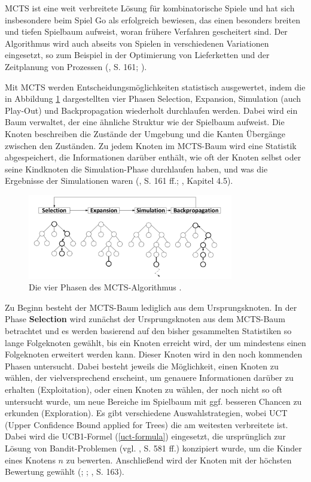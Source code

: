 MCTS ist eine weit verbreitete Lösung für kombinatorische Spiele und hat sich insbesondere beim Spiel Go als erfolgreich bewiesen, das einen besonders breiten und tiefen Spielbaum aufweist, woran frühere Verfahren gescheitert sind. Der Algorithmus wird auch abseits von Spielen in verschiedenen Variationen eingesetzt, so zum Beispiel in der Optimierung von Lieferketten und der Zeitplanung von Prozessen (\cite{Russell.2020}, S. 161; \cite{Browne.2012}).


Mit MCTS werden Entscheidungsmöglichkeiten statistisch ausgewertet, indem die in Abbildung \ref{fig:f27} dargestellten vier Phasen Selection, Expansion, Simulation (auch Play-Out) und Backpropagation wiederholt durchlaufen werden. Dabei wird ein Baum verwaltet, der eine ähnliche Struktur wie der Spielbaum aufweist. Die Knoten beschreiben die Zustände der Umgebung und die Kanten Übergänge zwischen den Zuständen. Zu jedem Knoten im MCTS-Baum wird eine Statistik abgespeichert, die Informationen darüber enthält, wie oft der Knoten selbst oder seine Kindknoten die Simulation-Phase durchlaufen haben, und was die Ergebnisse der Simulationen waren (\cite{Russell.2020}, S. 161 ff.; \cite{Ferguson.January2019}, Kapitel 4.5).

\begin{figure}[ht!]%
	\includegraphics[width=0.8\textwidth, center]{Bilder/mcts-phases.png}
	\caption[Die vier Phasen des MCTS-Algorithmus.]{Die vier Phasen des MCTS-Algorithmus \cite{Swiechowski.2021}.}
	\label{fig:f27}
\end{figure}

Zu Beginn besteht der MCTS-Baum lediglich aus dem Ursprungsknoten. In der Phase \textbf{Selection} wird zunächst der Ursprungsknoten aus dem MCTS-Baum betrachtet und es werden basierend auf den bisher gesammelten Statistiken so lange Folgeknoten gewählt, bis ein Knoten erreicht wird, der um mindestens einen Folgeknoten erweitert werden kann. Dieser Knoten wird in den noch kommenden Phasen untersucht. Dabei besteht jeweils die Möglichkeit, einen Knoten zu wählen, der vielversprechend erscheint, um genauere Informationen darüber zu erhalten (Exploitation), oder einen Knoten zu wählen, der noch nicht so oft untersucht wurde, um neue Bereiche im Spielbaum mit ggf. besseren Chancen zu erkunden (Exploration). Es gibt verschiedene Auswahlstrategien, wobei UCT (Upper Confidence Bound applied for Trees) die am weitesten verbreitete ist. Dabei wird die UCB1-Formel (\ref{uct-formula}) eingesetzt, die ursprünglich zur Lösung von Bandit-Problemen (vgl. \cite{Russell.2020}, S. 581 ff.) konzipiert wurde, um die Kinder eines Knotens $n$ zu bewerten. Anschließend wird der Knoten mit der höchsten Bewertung gewählt (\cite{Kocsis.2006}; \cite{Browne.2012}; \cite{Russell.2020}, S. 163).


